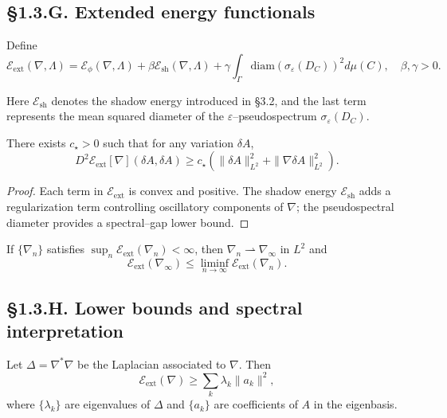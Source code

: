 \subsection*{§1.3.G. Extended energy functionals}

\begin{definition}\label{def:1.3.ext}
Define
\[
\mathcal E_{\mathrm{ext}}(\nabla,\Lambda)
 = \mathcal E_\phi(\nabla,\Lambda)
   + \beta \mathcal E_{\mathrm{sh}}(\nabla,\Lambda)
   + \gamma \!\int_\Gamma \!\mathrm{diam}(\sigma_\varepsilon(D_C))^2 d\mu(C),
\quad \beta,\gamma>0.
\]
\end{definition}

Here $\mathcal E_{\mathrm{sh}}$ denotes the shadow energy introduced in §3.2, and the last term represents the mean squared diameter of the $\varepsilon$–pseudospectrum $\sigma_\varepsilon(D_C)$.

\begin{theorem}\label{thm:1.3.ext-coercive}
There exists $c_\star>0$ such that for any variation $\delta A$,
\[
D^2\mathcal E_{\mathrm{ext}}[\nabla](\delta A,\delta A)
  \ge c_\star \left(\|\delta A\|_{L^2}^2+\|\nabla\delta A\|_{L^2}^2\right).
\]
\end{theorem}

\begin{proof}
Each term in $\mathcal E_{\mathrm{ext}}$ is convex and positive.  
The shadow energy $\mathcal E_{\mathrm{sh}}$ adds a regularization term controlling oscillatory components of $\nabla$; the pseudospectral diameter provides a spectral–gap lower bound.
\end{proof}

\begin{corollary}
If $\{\nabla_n\}$ satisfies $\sup_n\mathcal E_{\mathrm{ext}}(\nabla_n)<\infty$, then $\nabla_n\rightharpoonup\nabla_\infty$ in $L^2$ and
\[
\mathcal E_{\mathrm{ext}}(\nabla_\infty)\le \liminf_{n\to\infty}\mathcal E_{\mathrm{ext}}(\nabla_n).
\]
\end{corollary}

\subsection*{§1.3.H. Lower bounds and spectral interpretation}

\begin{lemma}\label{lem:1.3.spec}
Let $\Delta=\nabla^\ast\nabla$ be the Laplacian associated to $\nabla$.  
Then
\[
\mathcal E_{\mathrm{ext}}(\nabla)\ge \sum_{k} \lambda_k \|a_k\|^2,
\]
where $\{\lambda_k\}$ are eigenvalues of $\Delta$ and $\{a_k\}$ are coefficients of $A$ in the eigenbasis.
\end{lemma}

